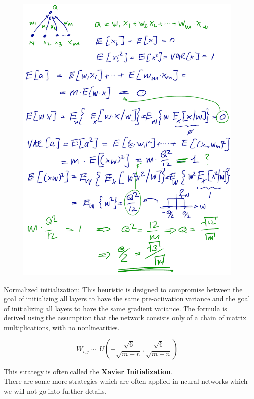 \begin{multicols}{2}
	\begin{figure}[H]
		\centering
		\includegraphics[width=0.9\linewidth]{images/InitStrat.png}
	\end{figure}

	Normalized initialization: This heuristic is designed to compromise between the goal of initializing all layers to have the same pre-activation variance and the goal of initializing all layers to have the same gradient variance. The formula is derived using the assumption that the network consists only of a chain of matrix multiplications, with no nonlinearities.

	\[ W_{i,j} \sim\ U ( -\frac{\sqrt{6}}{\sqrt{m + n}}, \frac{\sqrt{6}}{\sqrt{m + n}} )  \]

	This strategy is often called the \textbf{Xavier Initialization}.\\
	There are some more strategies which are often applied in neural networks which we will not go into further details.



	\newpage
\end{multicols}
